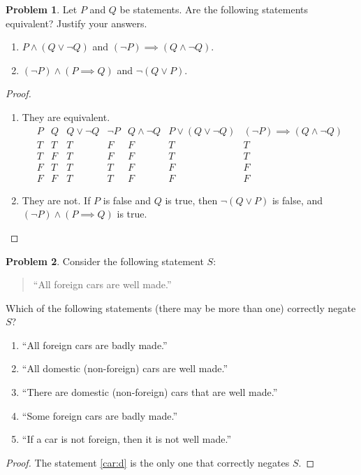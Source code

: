 \documentclass[11pt]{article}
\theoremstyle{definition}
\newtheorem{problem}{Problem}
\begin{document}
\begin{problem}
  Let $P$ and $Q$ be statements.  Are the following statements equivalent?  Justify your answers.
  \begin{enumerate}
  \item $P \land (Q \lor \lnot Q)$ and $(\lnot P) \implies (Q \land \lnot  Q)$.
  \item $(\lnot P) \land (P \implies Q)$ and $\lnot (Q \lor P)$.
  \end{enumerate}
\end{problem}
\begin{proof}
  \begin{enumerate}
  \item They are equivalent.
    \begin{equation*}
      \begin{array}{c|c|c|c|c|c|c}
        P & Q & Q \lor \lnot Q & \lnot P & Q \land \lnot Q & P \lor (Q \lor \lnot Q) & (\lnot P ) \implies (Q \land
                                                                                       \lnot Q) \\
        \hline
        T & T & T & F & F & T & T \\
        T & F & T & F & F & T & T \\
        F & T & T & T & F & F & F \\
        F & F & T & T & F & F & F
      \end{array}
    \end{equation*}
    \item They are not.  If $P$ is false and $Q$ is true, then $\lnot(Q \lor P)$ is false, and $(\lnot P) \land (P
      \implies Q)$ is true. \qedhere
  \end{enumerate}
\end{proof}

\begin{problem}
  Consider the following statement $S$:
  \begin{quote}
    ``All foreign cars are well made.''
  \end{quote}
  Which of the following statements (there may be more than one) correctly negate $S$?
  \begin{enumerate}
  \item\label{car:a} ``All foreign cars are badly made.''
  \item\label{car:b} ``All domestic (non-foreign) cars are well made.''
  \item\label{car:c} ``There are domestic (non-foreign) cars that are well made.''
  \item\label{car:d} ``Some foreign cars are badly made.''
  \item\label{car:e} ``If a car is not foreign, then it is not well made.''
  \end{enumerate}
\end{problem}
\begin{proof}
  The statement \ref{car:d} is the only one that correctly negates $S$.
\end{proof}
\end{document}
